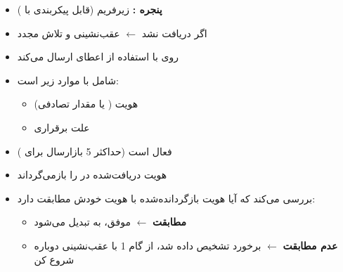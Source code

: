 \begin{itemize}
\tightlist
\item
  \textbf{پنجره :}  زیرفریم (قابل پیکربندی با )
\item
  اگر  دریافت نشد \ensuremath{\leftarrow} عقب‌نشینی و تلاش مجدد
\end{itemize}


\begin{itemize}
\tightlist
\item
   روی  با استفاده از اعطای  ارسال می‌کند
\item
  شامل  با موارد زیر است:

  \begin{itemize}
  \tightlist
  \item
    هویت  ( یا مقدار تصادفی)
  \item
    علت برقراری
  \end{itemize}
\item
   فعال است (حداکثر 5 بازارسال برای )
\end{itemize}


\begin{itemize}
\tightlist
\item
   هویت  دریافت‌شده در  را بازمی‌گرداند
\item
   بررسی می‌کند که آیا هویت بازگردانده‌شده با هویت خودش مطابقت دارد:

  \begin{itemize}
  \tightlist
  \item
    \textbf{مطابقت} \ensuremath{\leftarrow}  موفق،  به  تبدیل می‌شود
  \item
    \textbf{عدم مطابقت} \ensuremath{\leftarrow} برخورد تشخیص داده شد، از گام 1 با عقب‌نشینی دوباره شروع کن
  \end{itemize}
\end{itemize}




